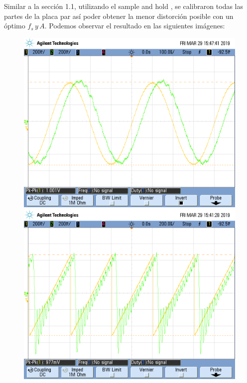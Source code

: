 \documentclass[../../ASSD_TP1_G7.tex]{subfiles}
\begin{document}
Similar a la sección 1.1, utilizando el sample and hold , se calibraron
todas las partes de la placa par así poder obtener la menor distorción
posible con un óptimo $f_{s}\,y\,A$. Podemos observar el resultado
en las siguientes imágenes:

\begin{figure}[H]

\begin{centering}
\includegraphics[scale=0.25]{Imagenes/syh_pto_asin3}\includegraphics[scale=0.25]{Imagenes/syh_pto_adiente}
\par\end{centering}

\end{figure}
\end{document}
